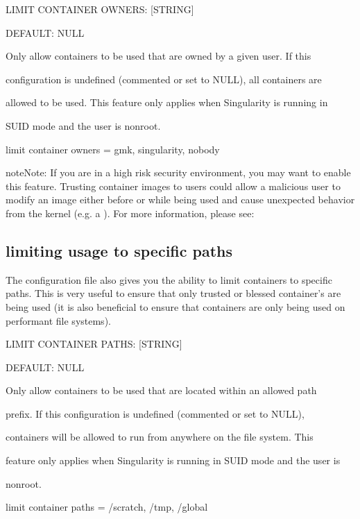 \documentclass[letterpaper,10pt,english]{sphinxmanual}
\begin{document}
%
\begin{sphinxVerbatim}[commandchars=\\\{\}]
\PYGZsh{} LIMIT CONTAINER OWNERS: [STRING]

\PYGZsh{} DEFAULT: NULL

\PYGZsh{} Only allow containers to be used that are owned by a given user. If this

\PYGZsh{} configuration is undefined (commented or set to NULL), all containers are

\PYGZsh{} allowed to be used. This feature only applies when Singularity is running in

\PYGZsh{} SUID mode and the user is non\PYGZhy{}root.

\PYGZsh{}limit container owners = gmk, singularity, nobody
\end{sphinxVerbatim}

\begin{sphinxadmonition}{note}{Note:}
If you are in a high risk security environment, you may want to
enable this feature. Trusting container images to users could allow a
malicious user to modify an image either before or while being used and
cause unexpected behavior from the kernel (e.g. a ). For
more information, please see: 
\end{sphinxadmonition}


\subsection{limiting usage to specific paths}
\label{\detokenize{security:limiting-usage-to-specific-paths}}
The configuration file also gives you the ability to limit containers to
specific paths. This is very useful to ensure that only trusted or
blessed container’s are being used (it is also beneficial to ensure that
containers are only being used on performant file systems).

%
\begin{sphinxVerbatim}[commandchars=\\\{\}]
\PYGZsh{} LIMIT CONTAINER PATHS: [STRING]

\PYGZsh{} DEFAULT: NULL

\PYGZsh{} Only allow containers to be used that are located within an allowed path

\PYGZsh{} prefix. If this configuration is undefined (commented or set to NULL),

\PYGZsh{} containers will be allowed to run from anywhere on the file system. This

\PYGZsh{} feature only applies when Singularity is running in SUID mode and the user is

\PYGZsh{} non\PYGZhy{}root.

\PYGZsh{}limit container paths = /scratch, /tmp, /global
\end{sphinxVerbatim}
\end{document}

